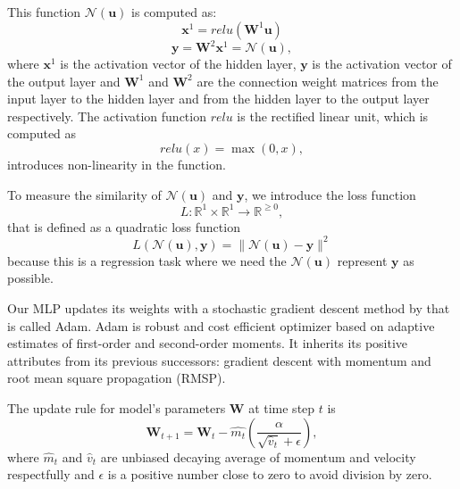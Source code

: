 This function $\mathcal{N}(\textbf{u})$ is computed as:
\begin{equation}
    \textbf{x}^1 = relu(\textbf{W}^1 \textbf{u})
\end{equation}
\begin{equation}
    \textbf{y} = \textbf{W}^2 \textbf{x}^1 = \mathcal{N}(\textbf{u}),
\end{equation}
where $\textbf{x}^1$ is the activation vector of the hidden layer, $\textbf{y}$ is the activation vector of the output layer and $\textbf{W}^1$ and $\textbf{W}^2$ are the connection weight matrices from the input layer to the hidden layer and from the hidden layer to the output layer respectively. The activation function $relu$ is the rectified linear unit, which is computed as
\begin{equation}
    relu(x) = \max(0, x),
\end{equation}
introduces non-linearity in the function.

To measure the similarity of $\mathcal{N}(\textbf{u})$ and $\textbf{y}$, we introduce the loss function
\begin{equation}
    L : \mathbb{R}^1 \times \mathbb{R}^1 \rightarrow \mathbb{R}^{\ge 0},
\end{equation}
that is defined as a quadratic loss function
\begin{equation}
    L(\mathcal{N}(\textbf{u}), \textbf{y}) = \parallel \mathcal{N}(\textbf{u}) - \textbf{y} \parallel ^2
\end{equation}
because this is a regression task where we need the $\mathcal{N}(\textbf{u})$ represent $\textbf{y}$ as possible.

Our MLP updates its weights with a stochastic gradient descent method by \citeauthor{adam} that is called Adam. Adam is robust and cost efficient optimizer based on adaptive estimates of first-order and second-order moments. It inherits its positive attributes from its previous successors: gradient descent with momentum and root mean square propagation (RMSP). 

The update rule for model's parameters $\textbf{W}$ at time step $t$ is 
\begin{equation}
    \textbf{W}_{t+1} = \textbf{W}_{t} - \hat{m_t} (\frac{\alpha}{\sqrt{\hat{v}_t} + \epsilon}),
\end{equation}
where $\hat{m}_t$ and $\hat{v}_t$ are unbiased decaying average of momentum and velocity respectfully and $\epsilon$ is a positive number close to zero to avoid division by zero.

